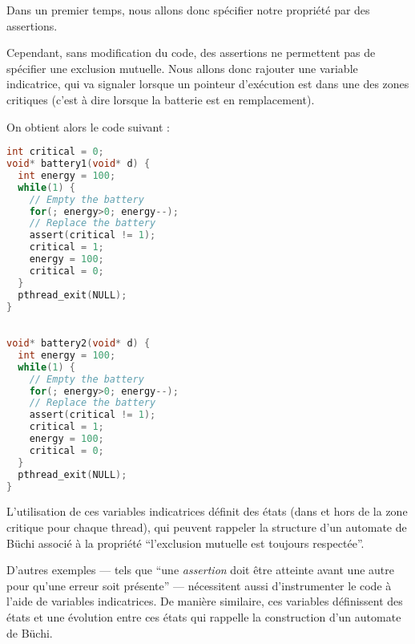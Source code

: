 Dans un premier temps, nous allons donc spécifier notre propriété par
des assertions.

Cependant, sans modification du code, des assertions ne permettent pas
de spécifier une exclusion mutuelle. Nous allons donc rajouter une
variable indicatrice, qui va signaler lorsque un pointeur d'exécution
est dans une des zones critiques (c'est à dire lorsque la batterie est
en remplacement).

On obtient alors le code suivant :

\noindent\begin{minipage}{.45\textwidth}
\begin{lstlisting}[language=C, frame=single, caption=Thread 1]
int critical = 0;
void* battery1(void* d) {
  int energy = 100;
  while(1) {
    // Empty the battery
    for(; energy>0; energy--);
    // Replace the battery
    assert(critical != 1);
    critical = 1;
    energy = 100;
    critical = 0;
  }
  pthread_exit(NULL);
}
\end{lstlisting}
\end{minipage}\hfill
\begin{minipage}{.45\textwidth}
\begin{lstlisting}[language=C, frame=single, caption=Thread 2]

void* battery2(void* d) {
  int energy = 100;
  while(1) {
    // Empty the battery
    for(; energy>0; energy--);
    // Replace the battery
    assert(critical != 1);
    critical = 1;
    energy = 100;
    critical = 0;
  }
  pthread_exit(NULL);
}
\end{lstlisting}
\end{minipage}


L'utilisation de ces variables indicatrices définit des états (dans et
hors de la zone critique pour chaque thread), qui peuvent rappeler la
structure d'un automate de Büchi associé à la propriété ``l'exclusion
mutuelle est toujours respectée''.

D'autres exemples --- tels que ``une \emph{assertion} doit être atteinte
avant une autre pour qu'une erreur soit présente'' --- nécessitent aussi
d'instrumenter le code à l'aide de variables indicatrices. De manière
similaire, ces variables définissent des états et une évolution entre
ces états qui rappelle la construction d'un automate de Büchi.

